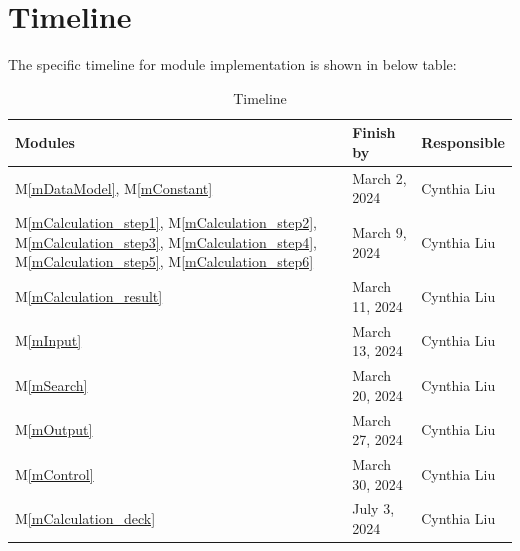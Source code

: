 \documentclass[12pt, titlepage]{article}
\newcommand{\mref}[1]{M\ref{#1}}
\begin{document}
\section{Timeline}
The specific timeline for module implementation is shown in below table:
\begin{table}[H]
\centering
\begin{tabular}{p{} p{}  p{}}
\toprule
 \textbf{Modules} & \textbf{Finish by} & \textbf{Responsible} \\
\midrule
\mref{mDataModel}, \mref{mConstant} & March 2, 2024& Cynthia Liu\\
\mref{mCalculation_step1}, \mref{mCalculation_step2}, \mref{mCalculation_step3}, \mref{mCalculation_step4}, \mref{mCalculation_step5}, \mref{mCalculation_step6} & March 9, 2024& Cynthia Liu\\
\mref{mCalculation_result} & March 11, 2024& Cynthia Liu\\
\mref{mInput} & March 13, 2024 & Cynthia Liu\\
\mref{mSearch} & March 20, 2024 & Cynthia Liu\\
\mref{mOutput}  & March 27, 2024 & Cynthia Liu\\
\mref{mControl} & March 30, 2024 & Cynthia Liu\\
\mref{mCalculation_deck} & July 3, 2024 & Cynthia Liu\\

\bottomrule
\end{tabular}
\caption{Timeline}
\end{table}
\end{document}
